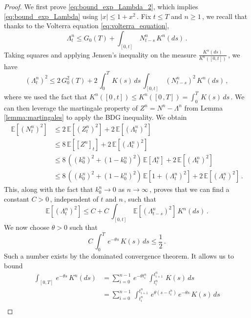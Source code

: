 \documentclass[10pt,a4paper]{amsart}
\begin{document}
\begin{proof}
    We first prove \eqref{eq:bound_exp_Lambda_2}, which implies \eqref{eq:bound_exp_Lambda} using $|x| \leq 1 + x^2\,$. Fix $t \leq T$ and $n \geq 1\,$, we recall that thanks to the Volterra equation \eqref{eq:volterra_equation},
    $$
    \Lambda_t^n  \leq G_0(T) + \int_{[0,t]}\,N^n_{t-s}\,K^n(ds)\,.
    $$
    Taking squares and applying Jensen's inequality on the measure $\frac{K^n(ds)}{K^n([0,t])}\,$, we have 
    $$
    \left(\Lambda^n_t\right)^2 \leq 2\,G_0^2(T) + 2\,\int_0^T\,K(s)\,ds \,\int_{[0,t]}\,\left(N^n_{t-s}\right)^2\,K^n(ds) \,,
    $$
    where we used the fact that $K^n([0\,,t]) \leq K^n([0\,,T]) = \int_0^T\,K(s)\,ds\,$.
    We can then leverage the martingale property of $Z^n = N^n - \Lambda^n$ from Lemma \ref{lemma:martingales} to apply the BDG inequality. We obtain
    \begin{align*}
        \mathbb E \left[\left(N^n_t\right)^2 \right] &\leq 2\, \mathbb E \left[\left(Z^n_t\right)^2 \right] + 2 \,\mathbb E \left[\left(\Lambda^n_t\right)^2 \right] \\
        &\leq 8\, \mathbb E \left[\left[Z^n\right]_t \right] + 2 \,\mathbb E \left[\left(\Lambda^n_t\right)^2 \right]\\ 
        &\leq 8\,\left(\left(k_0^n\right)^2 + \left(1 - k_0^n\right)^2\right)\,\mathbb E \left[\Lambda^n_t \right] + 2 \,\mathbb E \left[\left(\Lambda^n_t\right)^2 \right]\\
        &\leq 8\,\left(\left(k_0^n\right)^2 + \left(1 - k_0^n\right)^2\right)\,\mathbb E \left[1 + \left(\Lambda_t^n\right)^2 \right] + 2 \,\mathbb E \left[\left(\Lambda^n_t\right)^2 \right]\,.
    \end{align*}
    This, along with the fact that $k_0^n \to 0$ as $n \to \infty\,$, proves that we can find a constant $C > 0\,$, independent of $t$ and $n\,$, such that
    $$
    \mathbb E \left[\left(\Lambda^n_t\right)^2 \right] \leq C + C\,\int_{[0,t]}\,\mathbb E \left[\left(\Lambda^n_{t-s}\right)^2 \right]\,K^n(ds)\,.
    $$
    We now choose $\theta > 0$ such that 
    $$
    C \,\int_0^T\,e^{-\theta s}\,K(s)\,ds \leq \frac{1}{2}\,.
    $$
    Such a number exists by the dominated convergence theorem. It allows us to bound
    \begin{align*}
        \int_{[0,T]}\,e^{- \theta s}\,K^n(ds) &= \sum_{i = 0}^{n-1}\,e^{- \theta t^n_i}\, \int_{t^n_i}^{t^n_{i+1}}\,K(s)\,ds \\
        &= \sum_{i = 0}^{n-1}\,\int_{t^n_i}^{t^n_{i+1}}\,e^{\theta (s - t^n_i)}\,e^{- \theta s}\,K(s)\,ds \\

\end{align*}
\end{proof}
\end{document}
